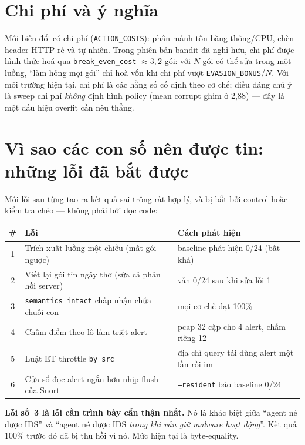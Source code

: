 \documentclass[12pt,a4paper]{report}
\begin{document}
\section{Chi phí và ý nghĩa}

Mỗi biến đổi có chi phí (\texttt{ACTION\_COSTS}): phân mảnh tốn băng thông/CPU, chèn
header HTTP rẻ và tự nhiên. Trong phiên bản bandit đã nghỉ hưu, chi phí được hình thức
hoá qua \texttt{break\_even\_cost} $\approx 3{,}2$ gói: với $N$ gói có thể sửa trong
một luồng, ``làm hỏng mọi gói'' chỉ hoà vốn khi chi phí vượt \texttt{EVASION\_BONUS}/$N$.
Với môi trường hiện tại, chi phí là các hằng số cố định theo cơ chế; điều đáng chú ý
là sweep chi phí \emph{không} định hình policy (mean corrupt ghim ở 2{,}88) — đây là
một dấu hiệu overfit cần nêu thẳng.

\section{Vì sao các con số nên được tin: những lỗi đã bắt được}

Mỗi lỗi sau từng tạo ra kết quả sai trông rất hợp lý, và bị bắt bởi control hoặc
kiểm tra chéo — không phải bởi đọc code:

\begin{center}
\begin{tabular}{cll}
\toprule
\# & Lỗi & Cách phát hiện \\
\midrule
1 & Trích xuất luồng một chiều (mất gói ngược) & baseline phát hiện 0/24 (bất khả) \\
2 & Viết lại gói tin ngây thơ (sửa cả phản hồi server) & vẫn 0/24 sau khi sửa lỗi 1 \\
3 & \texttt{semantics\_intact} chấp nhận chứa chuỗi con & mọi cơ chế đạt 100\% \\
4 & Chấm điểm theo lô làm triệt alert & pcap 32 cặp cho 4 alert, chấm riêng 12 \\
5 & Luật ET throttle \texttt{by\_src} & địa chỉ query tái dùng alert một lần rồi im \\
6 & Cửa sổ đọc alert ngắn hơn nhịp flush của Snort & \texttt{--resident} báo baseline 0/24 \\
\bottomrule
\end{tabular}
\end{center}

\textbf{Lỗi số~3 là lỗi cần trình bày cẩn thận nhất.} Nó là khác biệt giữa ``agent né
được IDS'' và ``agent né được IDS \emph{trong khi vẫn giữ malware hoạt động}''. Kết quả
100\% trước đó đã bị thu hồi vì nó. Mức hiện tại là byte-equality.
\end{document}
